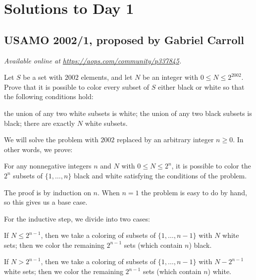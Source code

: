 \documentclass[11pt]{scrartcl}
\begin{document}
\section{Solutions to Day 1}
\subsection{USAMO 2002/1, proposed by Gabriel Carroll}
\textsl{Available online at \url{https://aops.com/community/p337845}.}
\begin{mdframed}[style=mdpurplebox,frametitle={Problem statement}]
Let $S$ be a set with $2002$ elements,
and let $N$ be an integer with $0 \leq N \leq 2^{2002}$.
Prove that it is possible to color every subset of $S$
either black or white so that the following conditions hold:
\begin{enumerate}
  \ii[(a)] the union of any two white subsets is white;
  \ii[(b)] the union of any two black subsets is black;
  \ii[(c)] there are exactly $N$ white subsets.
\end{enumerate}
\end{mdframed}
We will solve the problem with $2002$
replaced by an arbitrary integer $n \ge 0$.
In other words, we prove:
\begin{claim*}
  For any nonnegative integers $n$ and $N$ with $0 \le N \le 2^n$,
  it is possible to color the $2^n$ subsets
  of $\{1, \dots, n\}$ black and white
  satisfying the conditions of the problem.
\end{claim*}
The proof is by induction on $n$.
When $n = 1$ the problem is easy to do by hand,
so this gives us a base case.

For the inductive step, we divide into two cases:
\begin{itemize}
  \ii If $N \le 2^{n-1}$,
  then we take a coloring of subsets of $\{1, \dots, n-1\}$
  with $N$ white sets;
  then we color the remaining $2^{n-1}$ sets
  (which contain $n$) black.

  \ii If $N > 2^{n-1}$,
  then we take a coloring of subsets of $\{1, \dots, n-1\}$
  with $N - 2^{n-1}$ white sets;
  then we color the remaining $2^{n-1}$ sets
  (which contain $n$) white.
\end{itemize}
\pagebreak
\end{document}

